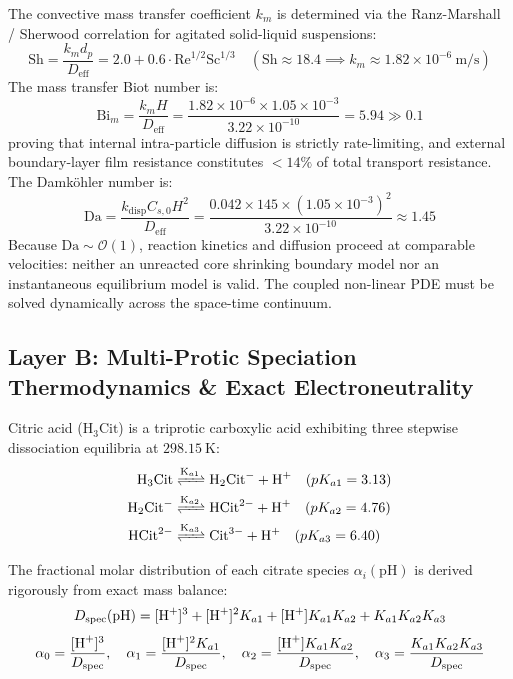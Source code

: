 \documentclass[10pt,a4paper]{article}
\begin{document}
The convective mass transfer coefficient $k_m$ is determined via the Ranz-Marshall / Sherwood correlation for agitated solid-liquid suspensions:
\begin{equation}
\mathrm{Sh} = \frac{k_m d_p}{D_{\mathrm{eff}}} = 2.0 + 0.6 \cdot \mathrm{Re}^{1/2} \mathrm{Sc}^{1/3} \quad (\mathrm{Sh} \approx 18.4 \implies k_m \approx 1.82 \times 10^{-6}\ \mathrm{m/s})
\end{equation}
The mass transfer Biot number is:
\begin{equation}
\mathrm{Bi}_m = \frac{k_m H}{D_{\mathrm{eff}}} = \frac{1.82 \times 10^{-6} \times 1.05 \times 10^{-3}}{3.22 \times 10^{-10}} = 5.94 \gg 0.1
\end{equation}
proving that internal intra-particle diffusion is strictly rate-limiting, and external boundary-layer film resistance constitutes $< 14\%$ of total transport resistance. The Damk\"{o}hler number is:
\begin{equation}
\mathrm{Da} = \frac{k_{\mathrm{disp}} C_{s,0} H^2}{D_{\mathrm{eff}}} = \frac{0.042 \times 145 \times (1.05 \times 10^{-3})^2}{3.22 \times 10^{-10}} \approx 1.45
\end{equation}
Because $\mathrm{Da} \sim \mathcal{O}(1)$, reaction kinetics and diffusion proceed at comparable velocities: neither an unreacted core shrinking boundary model nor an instantaneous equilibrium model is valid. The coupled non-linear PDE must be solved dynamically across the space-time continuum.

\subsection{Layer B: Multi-Protic Speciation Thermodynamics \& Exact Electroneutrality}
Citric acid ($\mathrm{H}_3\text{Cit}$) is a triprotic carboxylic acid exhibiting three stepwise dissociation equilibria at $298.15\ \mathrm{K}$:
\begin{align}
\label{eq:citric_ka1}
\ce{H3Cit} &\ce{<=>[K_{a1}]} \ce{H2Cit-} + \ce{H+} \quad (pK_{a1} = 3.13) \\
\label{eq:citric_ka2}
\ce{H2Cit-} &\ce{<=>[K_{a2}]} \ce{HCit^{2-}} + \ce{H+} \quad (pK_{a2} = 4.76) \\
\label{eq:citric_ka3}
\ce{HCit^{2-}} &\ce{<=>[K_{a3}]} \ce{Cit^{3-}} + \ce{H+} \quad (pK_{a3} = 6.40)
\end{align}

The fractional molar distribution of each citrate species $\alpha_i(\text{pH})$ is derived rigorously from exact mass balance:
\begin{equation}
D_{\mathrm{spec}}(\text{pH}) = [\ce{H+}]^3 + [\ce{H+}]^2 K_{a1} + [\ce{H+}] K_{a1} K_{a2} + K_{a1} K_{a2} K_{a3}
\end{equation}
\begin{equation}
\alpha_0 = \frac{[\ce{H+}]^3}{D_{\mathrm{spec}}}, \quad \alpha_1 = \frac{[\ce{H+}]^2 K_{a1}}{D_{\mathrm{spec}}}, \quad \alpha_2 = \frac{[\ce{H+}] K_{a1} K_{a2}}{D_{\mathrm{spec}}}, \quad \alpha_3 = \frac{K_{a1} K_{a2} K_{a3}}{D_{\mathrm{spec}}}
\end{equation}
\end{document}
